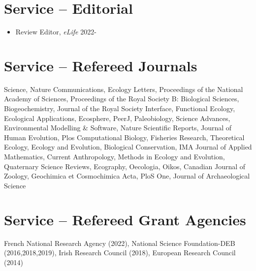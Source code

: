 \documentclass[margin,line,12pt]{res}
\begin{document}
\begin{resume}
\begin{itemize}
\end{itemize}

\section{\sc Service -- Editorial}
\begin{itemize}
  \item Review Editor, \emph{eLife} \hfill 2022-
\end{itemize}


\section{\sc Service -- Refereed Journals}
Science,
Nature Communications,
Ecology Letters,
Proceedings of the National Academy of Sciences,
Proceedings of the Royal Society B: Biological Sciences,
Biogeochemistry,
Journal of the Royal Society Interface,
Functional Ecology,
Ecological Applications,
Ecosphere,
PeerJ,
Paleobiology,
Science Advances,
Environmental Modelling \& Software,
Nature Scientific Reports,
Journal of Human Evolution,
Plos Computational Biology,
Fisheries Research,
Theoretical Ecology,
Ecology and Evolution,
Biological Conservation,
IMA Journal of Applied Mathematics,
Current Anthropology,
Methods in Ecology and Evolution,
Quaternary Science Reviews,
Ecography,
Oecologia,
Oikos,
Canadian Journal of Zoology,
Geochimica et Cosmochimica Acta,
PloS One,
Journal of Archaeological Science

\section{\sc Service -- Refereed Grant Agencies}
French National Research Agency (2022),
National Science Foundation-DEB (2016,2018,2019),
Irish Research Council (2018),
European Research Council (2014)

\vspace{0.6cm}


\end{resume}
\end{document}
